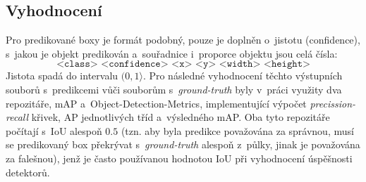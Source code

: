 \subsection*{Vyhodnocení}
Pro predikované boxy je formát podobný, pouze je doplněn o~jistotu (confidence), s~jakou je objekt predikován a~souřadnice i~proporce objektu jsou celá čísla:
$$\texttt{<class> <confidence> <x> <y> <width> <height>}$$
Jistota spadá do intervalu $(0,1\rangle$. Pro následné vyhodnocení těchto výstupních souborů s~predikcemi vůči souborům s~\emph{ground-truth} byly v~práci využity dva repozitáře, mAP\footnotemark
{}
a~Object-Detection-Metrics\footnotemark, implementující výpočet \emph{precission-recall} křivek, AP jednotlivých tříd a~výsledného mAP. Oba tyto repozitáře počítají s~IoU alespoň $0.5$ (tzn. aby byla predikce považována za správnou, musí se predikovaný box překrývat s~\emph{ground-truth} alespoň z~půlky, jinak je považována za falešnou), jenž je často používanou hodnotou IoU při vyhodnocení úspěšnosti detektorů.

